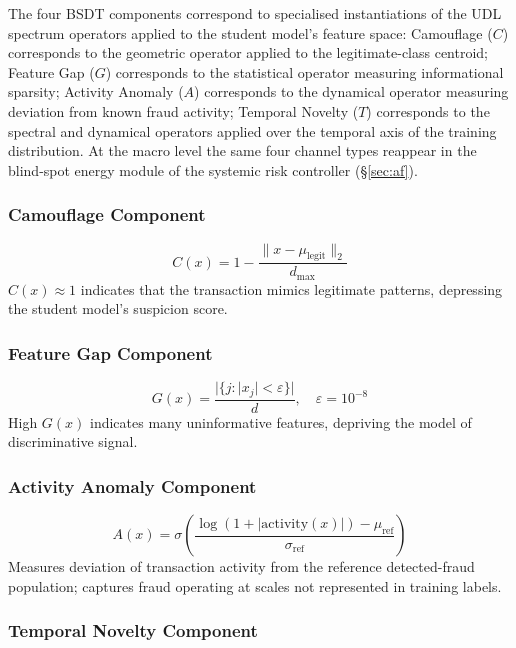 \documentclass[12pt,a4paper]{article}
\begin{document}
The four BSDT components correspond to specialised instantiations of
the UDL spectrum operators applied to the student model's feature space:
Camouflage ($C$) corresponds to the geometric operator applied to the
legitimate-class centroid; Feature Gap ($G$) corresponds to the
statistical operator measuring informational sparsity; Activity Anomaly
($A$) corresponds to the dynamical operator measuring deviation from
known fraud activity; Temporal Novelty ($T$) corresponds to the spectral
and dynamical operators applied over the temporal axis of the training
distribution. At the macro level the same four channel types reappear in
the blind-spot energy module of the systemic risk controller
(\S\ref{sec:af}).

\subsubsection{Camouflage Component}

\begin{equation}
C(x) = 1 - \frac{\|x-\mu_{\mathrm{legit}}\|_2}{d_{\max}}
\end{equation}
$C(x)\approx 1$ indicates that the transaction mimics legitimate patterns,
depressing the student model's suspicion score.

\subsubsection{Feature Gap Component}

\begin{equation}
G(x) = \frac{|\{j:|x_j|<\varepsilon\}|}{d}, \quad \varepsilon=10^{-8}
\end{equation}
High $G(x)$ indicates many uninformative features, depriving the model
of discriminative signal.

\subsubsection{Activity Anomaly Component}

\begin{equation}
A(x) = \sigma\!\left(
\frac{\log(1+|\mathrm{activity}(x)|)-\mu_{\mathrm{ref}}}
{\sigma_{\mathrm{ref}}}\right)
\end{equation}
Measures deviation of transaction activity from the reference
detected-fraud population; captures fraud operating at scales not
represented in training labels.

\subsubsection{Temporal Novelty Component}
\end{document}
